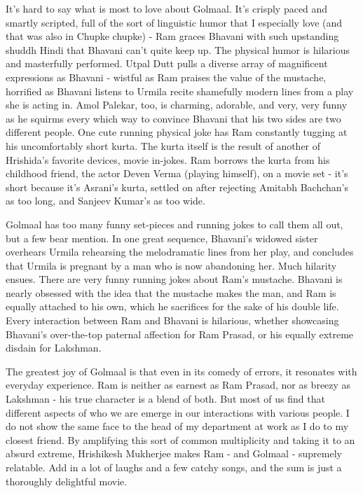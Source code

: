 \documentclass{article}
\begin{document}
It's hard to say what is most to love about Golmaal.  It's crisply paced and smartly scripted, full of the sort of linguistic humor that I especially love (and that was also in Chupke chupke) - Ram graces Bhavani with such upstanding shuddh Hindi that Bhavani can't quite keep up.  The physical humor is hilarious and masterfully performed.  Utpal Dutt pulls a diverse array of magnificent expressions as Bhavani - wistful as Ram praises the value of the mustache, horrified as Bhavani listens to Urmila recite shamefully modern lines from a play she is acting in.  Amol Palekar, too, is charming, adorable, and very, very funny as he squirms every which way to convince Bhavani that his two sides are two different people.  One cute running physical joke has Ram constantly tugging at his uncomfortably short kurta.  The kurta itself is the result of another of Hrishida's favorite devices, movie in-jokes.  Ram borrows the kurta from his childhood friend, the actor Deven Verma (playing himself), on a movie set - it's short because it's Asrani's kurta, settled on after rejecting Amitabh Bachchan's as too long, and Sanjeev Kumar's as too wide.

Golmaal has too many funny set-pieces and running jokes to call them all out, but a few bear mention.  In one great sequence, Bhavani's widowed sister overhears Urmila rehearsing the melodramatic lines from her play, and concludes that Urmila is pregnant by a man who is now abandoning her.  Much hilarity ensues.  There are very funny running jokes about Ram's mustache.  Bhavani is nearly obsessed with the idea that the mustache makes the man, and Ram is equally attached to his own, which he sacrifices for the sake of his double life.  Every interaction between Ram and Bhavani is hilarious, whether showcasing Bhavani's over-the-top paternal affection for Ram Prasad, or his equally extreme disdain for Lakshman. 

The greatest joy of Golmaal is that even in its comedy of errors, it resonates with everyday experience.  Ram is neither as earnest as Ram Prasad, nor as breezy as Lakshman - his true character is a blend of both.  But most of us find that different aspects of who we are emerge in our interactions with various people.  I do not show the same face to the head of my department at work as I do to my closest friend.  By amplifying this sort of common multiplicity and taking it to an absurd extreme, Hrishikesh Mukherjee makes Ram - and Golmaal - supremely relatable.  Add in a lot of laughs and a few catchy songs, and the sum is just a thoroughly delightful movie.
\end{document}
